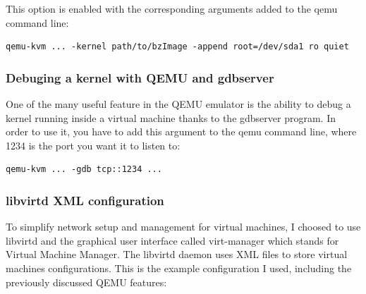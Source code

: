 \documentclass[pdftex,a4paper,titlepage,11pt]{article}
\begin{document}
This option is enabled with the corresponding arguments added to the qemu
command line:

\begin{lstlisting}
qemu-kvm ... -kernel path/to/bzImage -append root=/dev/sda1 ro quiet
\end{lstlisting}

\subsubsection{Debuging a kernel with QEMU and gdbserver}

One of the many useful feature in the QEMU emulator is the ability to debug a
kernel running inside a virtual machine thanks to the gdbserver program. In
order to use it, you have to add this argument to the qemu command line, where
1234 is the port you want it to listen to:

\begin{lstlisting}
qemu-kvm ... -gdb tcp::1234 ...
\end{lstlisting}

\subsubsection{libvirtd XML configuration}

To simplify network setup and management for virtual machines, I choosed to
use libvirtd and the graphical user interface called virt-manager which
stands for Virtual Machine Manager. The libvirtd daemon uses XML files to
store virtual machines configurations. This is the example configuration I used,
including the previously discussed QEMU features:

\begin{lstlisting}

\end{lstlisting}



\end{document}
